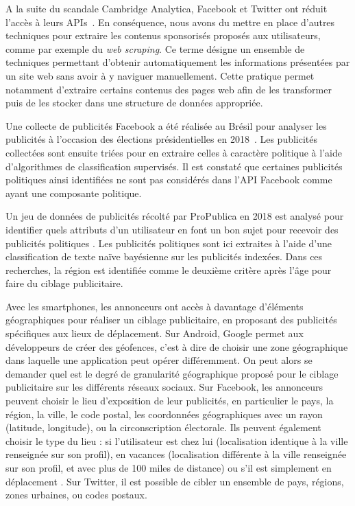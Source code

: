 \documentclass[runningheads]{llncs}
\begin{document}
A la suite du scandale Cambridge Analytica, Facebook et Twitter ont réduit l'accès à leurs APIs~\cite{axel_bruns_after_2019}. En conséquence, nous avons du mettre en place d'autres techniques pour extraire les contenus sponsorisés proposés aux utilisateurs, comme par exemple du \textit{web scraping}. Ce terme désigne un ensemble de techniques permettant d'obtenir automatiquement les informations présentées par un site web sans avoir à y naviguer manuellement. Cette pratique permet notamment d'extraire certains contenus des pages web afin de les transformer puis de les stocker dans une structure de données appropriée. 

Une collecte de publicités Facebook a été réalisée au Brésil pour analyser les publicités à l'occasion des élections présidentielles en 2018~\cite{silva_facebook_2020}. Les publicités collectées sont ensuite triées pour en extraire celles à caractère politique à l'aide d'algorithmes de classification supervisés. Il est constaté que certaines publicités politiques ainsi identifiées ne sont pas considérés dans l'API Facebook comme ayant une composante politique. %


Un jeu de données de publicités récolté par ProPublica en 2018 est analysé pour identifier quels attributs d'un utilisateur en font un bon sujet pour recevoir des publicités politiques \cite{levi_automatically_2020}. Les publicités politiques sont ici extraites à l'aide d'une classification de texte naïve bayésienne sur les publicités indexées. Dans ces recherches, la région est identifiée comme le deuxième critère après l'âge pour faire du ciblage publicitaire. 


Avec les smartphones, les annonceurs ont accès à davantage  d'éléments géographiques pour réaliser un ciblage publicitaire, en proposant des publicités spécifiques aux lieux de déplacement. Sur Android, Google permet aux développeurs de créer des géofences, c'est à dire de choisir une zone géographique dans laquelle une application peut opérer différemment. On peut alors se demander quel est le degré de granularité géographique proposé pour le ciblage publicitaire sur les différents réseaux sociaux. Sur Facebook, les annonceurs peuvent choisir le lieu d'exposition de leur publicités, en particulier le pays, la région, la ville, le code postal, les coordonnées géographiques avec un rayon (latitude, longitude), ou la circonscription électorale. Ils peuvent également choisir le type du lieu : si l'utilisateur est chez lui (localisation identique à la ville renseignée sur son profil), en vacances (localisation différente à la ville renseignée sur son profil, et avec plus de 100 miles de distance) ou s'il est simplement en déplacement \cite{noauthor_ciblage_nodate}. Sur Twitter, il est possible de cibler un ensemble de pays, régions, zones urbaines, ou codes postaux. 
\end{document}
